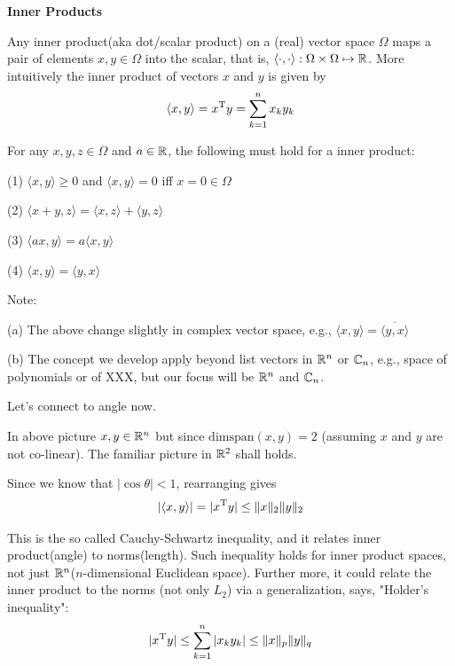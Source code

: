 \vspace{0.5cm}
\noindent\textbf{Inner Products}

Any inner product(aka dot/scalar product) on a (real) vector space $\Omega$ maps a pair of elements $x, y\in\Omega$ into the scalar, that is, $\langle\cdot,\cdot\rangle:\Omega\times\Omega\mapsto\mathbb{R}$. More intuitively the inner product of vectors $x$ and $y$ is given by 
$$\langle x,y\rangle=x^{{\rm T}}y=\sum_{k=1}^{n}x_{k}y_{k}$$


For any $x, y, z\in\Omega$ and $a\in\mathbb{R}$, the following must hold for a inner product:

(1) $\langle x,y\rangle\geq 0$ and $\langle x,y\rangle=0$ iff $x=0\in\Omega$

(2) $\langle x+y,z\rangle=\langle x,z\rangle+\langle y,z\rangle$

(3) $\langle ax,y\rangle=a\langle x,y\rangle$

(4) $\langle x,y\rangle=\langle y,x\rangle$

\vspace{0.2cm}
Note:

(a) The above change slightly in complex vector space, e.g., $\langle x,y\rangle=\overline{\langle y,x\rangle}$

(b) The concept we develop apply beyond list vectors in $\mathbb{R}^{n}$ or $\mathbb{C}_{n}$, e.g., space of polynomials or of XXX, but our focus will be $\mathbb{R}^{n}$ and $\mathbb{C}_{n}$.


\vspace{0.5cm}
Let's connect to angle now.

\begin{figure}
	\centering
	\resizebox{7.5cm}{3cm}{}
	\caption{}
	\label{}
\end{figure}

In above picture $x, y\in\mathbb{R}^{n}$ but since $\text{dim}{\text{span}({x, y})}=2$ (assuming $x$ and $y$ are not co-linear). The familiar picture in $\mathbb{R}^{2}$ shall holds.

Since we know that $\vert\cos\theta\vert <1$, rearranging gives
$$\vert\langle x,y\rangle\vert =\vert x^{{\rm T}}y\vert \leq \Vert x\Vert_{2} \Vert y\Vert_{2}$$

This is the so called Cauchy-Schwartz inequality, and it relates inner product(angle) to norms(length). Such inequality holds for inner product spaces, not just $\mathbb{R}^{n}$($n$-dimensional Euclidean space). Further more, it could relate the inner product to the norms (not only $L_{2}$) via a generalization, says, "Holder's inequality":
$$\vert x^{{\rm T}}y\vert\leq \sum_{k=1}^{n}\vert x_{k}y_{k}\vert \leq \Vert x\Vert_{p}\Vert y\Vert_{q}$$

